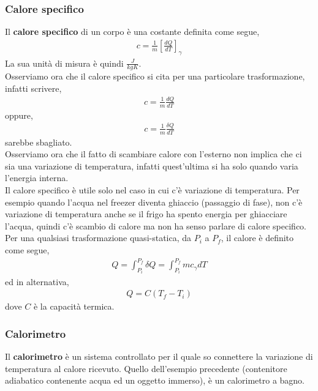         \subsubsection{Calore specifico}
            Il \textbf{calore specifico} di un corpo è una costante definita come segue,
            \begin{align*}
                c = \frac{1}{m}\left[\frac{dQ}{dT}\right]_{\gamma}
            \end{align*}
            La sua unità di misura è quindi $\frac{J}{kgK}$.\\
            Osserviamo ora che il calore specifico si cita per una particolare trasformazione, infatti scrivere,
            \begin{align*}
                c = \frac{1}{m}\frac{dQ}{dT}
            \end{align*}
            oppure,
            \begin{align*}
                c = \frac{1}{m}\frac{\delta Q}{dT}
            \end{align*}
            sarebbe sbagliato.\\
            Osserviamo ora che il fatto di scambiare calore con l'esterno non implica che ci sia una variazione di temperatura, infatti quest'ultima si ha solo quando varia l'energia interna.\\
            Il calore specifico è utile solo nel caso in cui c'è variazione di temperatura. Per esempio quando l'acqua nel freezer diventa ghiaccio (passaggio di fase), non c'è variazione di temperatura anche se il frigo ha spento energia per ghiacciare l'acqua, quindi c'è scambio di calore ma non ha senso parlare di calore specifico.\\

            Per una qualsiasi trasformazione quasi-statica, da $P_i$ a $P_f$, il calore è definito come segue,
            \begin{align*}
                Q = \int_{P_i}^{P_f} \delta Q = \int_{P_i}^{P_f} mc_{\gamma}dT
            \end{align*}
            ed in alternativa,
            \begin{align*}
                Q = C(T_f - T_i)
            \end{align*}
            dove $C$ è la capacità termica.

        \subsubsection{Calorimetro}
            Il \textbf{calorimetro} è un sistema controllato per il quale so connettere la variazione di temperatura al calore ricevuto. Quello dell'esempio precedente (contenitore adiabatico contenente acqua ed un oggetto immerso), è un calorimetro a bagno.

